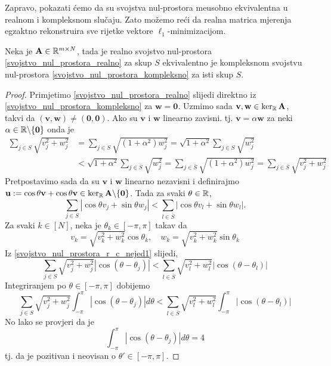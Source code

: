 \documentclass[a4paper,twoside,12pt]{memoir} %
\newcommand{\vect}[1]{\mathbf{#1}}
\renewcommand{\vec}{\vect}
\begin{document}
\noindent
Zapravo, pokazati \'cemo da su svojstva nul-prostora me\dj usobno ekvivalentna u realnom i kompleksnom slu\v{c}aju. Zato mo\v{z}emo re\'ci da realna matrica mjerenja egzaktno rekonstruira sve rijetke vektore $\ell_1$-minimizacijom. 
\begin{thm}
    Neka je $\vec A \in \R^{m \times N}$, tada je realno svojstvo nul-prostora \eqref{svojstvo_nul_prostora_realno} za skup $S$ ekvivalentno je kompleksnom svojstvu nul-prostora \eqref{svojstvo_nul_prostora_kompleksno} za isti skup $S$.
\end{thm}
\begin{proof}
    Primjetimo \eqref{svojstvo_nul_prostora_realno} slijedi direktno iz \eqref{svojstvo_nul_prostora_kompleksno} za $\vec w = \vec 0$. Uzmimo sada $\vec v, \vec w \in \ker_{\R}\vec A$, takvi da $(\vec v, \vec w) \neq (\vec 0, \vec 0)$. Ako su $\vec v$ i $\vec w$ linearno zavisni. tj. $\vec v = \alpha \vec w$ za neki $\alpha \in \R \backslash \{ \vec 0 \}$ onda je 
   \begin{align*}
       \sum_{j \in S} \sqrt{v_j^2+w_j^2} &=  \sum_{j \in S} \sqrt{(1+\alpha^2)w_j^2}=\sqrt{1+\alpha^2}\sum_{j \in S} \sqrt{w_j^2}\\
       &< \sqrt{1+\alpha^2}\sum_{j \in \bar S} \sqrt{w_j^2} = \sum_{j \in \bar S} \sqrt{(1+\alpha^2)w_j^2} = \sum_{j \in \bar S} \sqrt{v_j^2+w_j^2}
   \end{align*} 
   Pretpostavimo sada da su $\vec v$ i $\vec w$ linearno nezavisni i definirajmo $\vec u := \cos \theta \vec v + \cos \theta \vec v \in \ker_{\R} \vec A \backslash \{\vec 0\}$. Tada za svaki $\theta \in \mathbb{R}$,
   \begin{equation}\label{svojstvo_nul_prostora_r_c_nejed1}
       \sum_{j \in S} |\cos \theta v_j + \sin \theta w_j| < \sum_{l \in \bar S} |\cos \theta v_l + \sin \theta w_l|.
   \end{equation}
   Za svaki $k \in [N]$, neka je $\theta_k \in [-\pi, \pi]$ takav da
   \begin{equation*}
       v_k = \sqrt{v_k^2 + w_k^2}\cos{\theta_k}, \quad w_k = \sqrt{v_k^2 + w_k^2}\sin{\theta_k}
   \end{equation*}
   Iz \eqref{svojstvo_nul_prostora_r_c_nejed1} slijedi,
   \begin{equation*}
       \sum_{j \in S}\sqrt{v_j^2+w_j^2}|\cos(\theta - \theta_j)|<\sum_{l \in \bar S}\sqrt{v_l^2+w_l^2}|\cos(\theta - \theta_l)|
   \end{equation*}
   Integriranjem po $\theta \in [-\pi,\pi]$ dobijemo
   \begin{equation*}
       \sum_{j \in S}\sqrt{v_j^2+w_j^2}\int_{-\pi}^{\pi}  |\cos(\theta - \theta_j)| d \theta<\sum_{l \in \bar S}\sqrt{v_l^2+w_l^2}\int_{-\pi}^{\pi}  |\cos(\theta - \theta_l)|
   \end{equation*}
    No lako se provjeri da je
    \begin{equation*}
         \int_{-\pi}^{\pi}  |\cos(\theta - \theta_j)| d \theta = 4
    \end{equation*}
    tj. da je pozitivan i neovisan o $\theta' \in [-\pi, \pi]$.
\end{proof}
\end{document}
